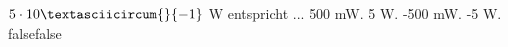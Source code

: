     {$5 \cdot 10\textasciicircum{}\{-1\}$ W entspricht ...}
    {500 mW.}
    {5 W.}
    {-500 mW.}
    {-5 W.}
    {false}{false}